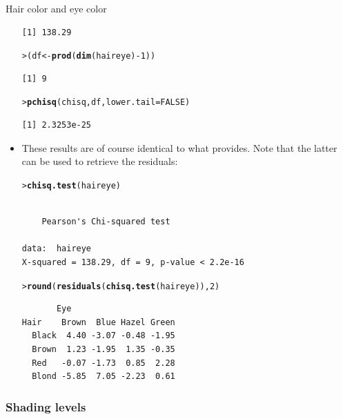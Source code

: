 \documentclass[10pt,krantz2]{krantz}\usepackage[]{graphicx}\usepackage[]{color}
\makeatletter
\newcommand{\hlnum}[1]{\textcolor[rgb]{0.686,0.059,0.569}{#1}}%
\newcommand{\hlopt}[1]{\textcolor[rgb]{0,0,0}{#1}}%
\newcommand{\hlstd}[1]{\textcolor[rgb]{0.345,0.345,0.345}{#1}}%
\newcommand{\hlkwb}[1]{\textcolor[rgb]{0.69,0.353,0.396}{#1}}%
\newcommand{\hlkwc}[1]{\textcolor[rgb]{0.333,0.667,0.333}{#1}}%
\newcommand{\hlkwd}[1]{\textcolor[rgb]{0.737,0.353,0.396}{\textbf{#1}}}%
\newenvironment{kframe}{%
 \def\at@end@of@kframe{}%
 \ifinner\ifhmode%
  \def\at@end@of@kframe{\end{minipage}}%
  \begin{minipage}{\columnwidth}%
 \fi\fi%
 \def\FrameCommand##1{\hskip\@totalleftmargin \hskip-\fboxsep
 \colorbox{shadecolor}{##1}\hskip-\fboxsep
     \hskip-\linewidth \hskip-\@totalleftmargin \hskip\columnwidth}%
 \MakeFramed {\advance\hsize-\width
   \@totalleftmargin\z@ \linewidth\hsize
   \@setminipage}}%
 {\par\unskip\endMakeFramed%
 \at@end@of@kframe}
\newenvironment{knitrout}{}{} %
\renewenvironment{knitrout}{\small\renewcommand{\baselinestretch}{.85}}{} %
\makeatother
\begin{document}
\begin{Example}[haireye2a]{Hair color and eye color}
\begin{itemize}
\begin{knitrout}
\begin{kframe}
\begin{verbatim}
[1] 138.29
\end{verbatim}
\begin{alltt}
\hlstd{> }\hlstd{(df} \hlkwb{<-} \hlkwd{prod}\hlstd{(}\hlkwd{dim}\hlstd{(haireye)} \hlopt{-} \hlnum{1}\hlstd{))}
\end{alltt}
\begin{verbatim}
[1] 9
\end{verbatim}
\begin{alltt}
\hlstd{> }\hlkwd{pchisq}\hlstd{(chisq, df,} \hlkwc{lower.tail} \hlstd{=} \hlnum{FALSE}\hlstd{)}
\end{alltt}
\begin{verbatim}
[1] 2.3253e-25
\end{verbatim}
\end{kframe}
\end{knitrout}
\item These results are of course identical to what 
  provides. Note that the latter can be used to retrieve the residuals:
\begin{knitrout}
\color{fgcolor}\begin{kframe}
\begin{alltt}
\hlstd{> }\hlkwd{chisq.test}\hlstd{(haireye)}
\end{alltt}
\begin{verbatim}

	Pearson's Chi-squared test

data:  haireye
X-squared = 138.29, df = 9, p-value < 2.2e-16
\end{verbatim}
\begin{alltt}
\hlstd{> }\hlkwd{round}\hlstd{(}\hlkwd{residuals}\hlstd{(}\hlkwd{chisq.test}\hlstd{(haireye)),} \hlnum{2}\hlstd{)}
\end{alltt}
\begin{verbatim}
       Eye
Hair    Brown  Blue Hazel Green
  Black  4.40 -3.07 -0.48 -1.95
  Brown  1.23 -1.95  1.35 -0.35
  Red   -0.07 -1.73  0.85  2.28
  Blond -5.85  7.05 -2.23  0.61
\end{verbatim}
\end{kframe}
\end{knitrout}
\end{itemize}
\end{Example}

\subsubsection{Shading levels}
\end{document}
